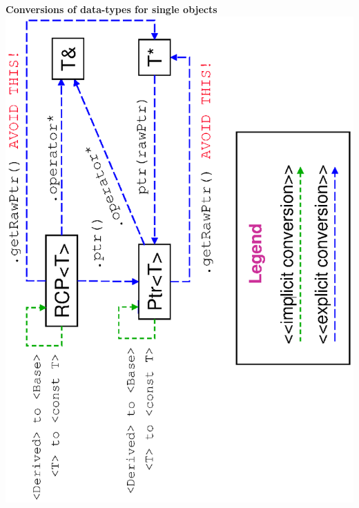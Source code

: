 \documentclass[pdf,ps2pdf,11pt]{SANDreport}
\begin{document}
\begin{center}















\pagebreak



\pagebreak



\pagebreak





\pagebreak

{}\textbf{Conversions of data-types for single objects}
\includegraphics*[angle=270,scale=0.65]{TeuchosPtrConversions} \\[5ex]


\end{center}
\end{document}
